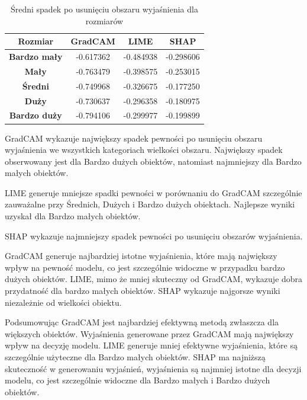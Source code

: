 \begin{table}[h]
	\centering
	\begin{tabular}{|c|c|c|c|}
		\hline
		\textbf{Rozmiar}     & \textbf{GradCAM} & \textbf{LIME} & \textbf{SHAP} \\
		\hline
		\textbf{Bardzo mały} & -0.617362        & -0.484938     & -0.298606     \\
		\hline
		\textbf{Mały}        & -0.763479        & -0.398575     & -0.253015     \\
		\hline
		\textbf{Średni}      & -0.749968        & -0.326675     & -0.177250     \\
		\hline
		\textbf{Duży}        & -0.730637        & -0.296358     & -0.180975     \\
		\hline
		\textbf{Bardzo duży} & -0.794106        & -0.299977     & -0.199899     \\
		\hline
	\end{tabular}
	\caption{Średni spadek po usunięciu obszaru wyjaśnienia dla rozmiarów}
	\label{tab:size_confidence_no_exp}
\end{table}

GradCAM wykazuje największy spadek pewności po usunięciu obszaru wyjaśnienia we wszystkich kategoriach wielkości obszaru.
Największy spadek obserwowany jest dla Bardzo dużych obiektów, natomiast najmniejszy dla Bardzo małych obiektów.

LIME generuje mniejsze spadki pewności w porównaniu do GradCAM szczególnie zauważalne przy Średnich, Dużych i Bardzo dużych obiektach.
Najlepsze wyniki uzyskał dla Bardzo małych obiektów.

SHAP wykazuje najmniejszy spadek pewności po usunięciu obszarów wyjaśnienia.

GradCAM generuje najbardziej istotne wyjaśnienia, które mają największy wpływ na pewność modelu, co jest szczególnie widoczne w przypadku bardzo dużych obiektów.
LIME, mimo że mniej skuteczny od GradCAM, wykazuje dobra przydatność dla bardzo małych obiektów.
SHAP wykazuje najgorsze wyniki niezależnie od wielkości obiektu.

\vspace{1cm}
Podsumowując GradCAM jest najbardziej efektywną metodą zwłaszcza dla większych obiektów.
Wyjaśnienia generowane przez GradCAM mają największy wpływ na decyzję modelu.
LIME generuje mniej efektywne wyjaśnienia, które są szczególnie użyteczne dla Bardzo małych obiektów.
SHAP ma najniższą skuteczność w generowaniu wyjaśnień, wyjaśnienia są najmniej istotne dla decyzji modelu, co jest szczególnie widoczne dla Bardzo małych i Bardzo dużych obiektów.
